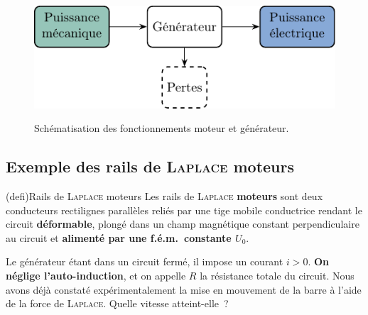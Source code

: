 \documentclass[../../main/main.tex]{subfiles}
\begin{document}
\begin{figure}[h]
\begin{minipage}[c]{.48\linewidth}
{		}{
			\includegraphics[width=\linewidth]{genedef_prof}
		}%
	\end{minipage}
	\caption{Schématisation des fonctionnements moteur et générateur.}
	\label{fig:motgene}
\end{figure}
\vspace*{-20pt}

\subsection{Exemple des rails de \textsc{Laplace} moteurs}
\label{ssec:rlplmot}
\begin{tcb*}(defi){Rails de \textsc{Laplace} moteurs}
	Les rails de \textsc{Laplace} \textbf{moteurs} sont deux conducteurs
	rectilignes parallèles reliés par une tige mobile conductrice rendant le
	circuit \textbf{déformable}, plongé dans un champ magnétique constant
	perpendiculaire au circuit et \textbf{alimenté par une f.é.m.\ constante
		$U_0$}.
\end{tcb*}
\noindent
\begin{minipage}[c]{.50\linewidth}
	Le générateur étant dans un circuit fermé, il impose un courant $i > 0$.
	\textbf{On néglige l'auto-induction}, et on appelle $R$ la résistance totale du
	circuit. Nous avons déjà constaté expérimentalement la mise en mouvement de la
	barre à l'aide de la force de \textsc{Laplace}. Quelle vitesse atteint-elle~?
\end{minipage}
\hfill
\end{document}

